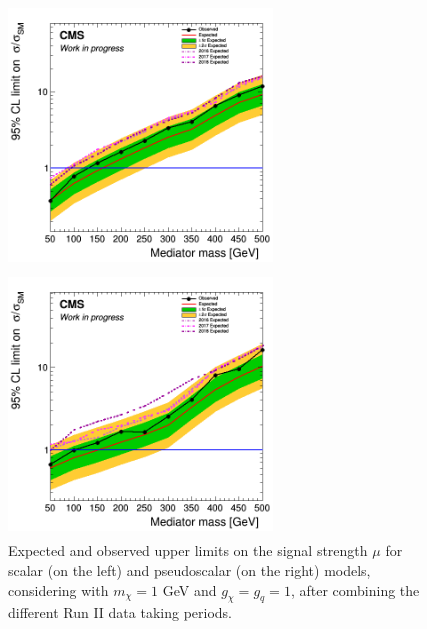 \documentclass[a4paper, 10pt, openright]{report}
\begin{document}
\begin{figure}[htbp]
\centering
\begin{minipage}[b]{.49\textwidth}
\includegraphics[width=7cm, height=7cm]{figs/limit_scalar.png}
\end{minipage}\hfill
\begin{minipage}[b]{.49\textwidth}
\includegraphics[width=7cm, height=7cm]{figs/limit_pseudo.png}
\end{minipage} \hfill
\caption{Expected and observed upper limits on the signal strength $\mu$ for scalar (on the left) and pseudoscalar (on the right) models, considering with $m_\chi = 1$ GeV and $g_\chi = g_q = 1$, after combining the different Run II data taking periods.}
\label{fig:limitsPerYear}

\end{figure}
\end{document}
